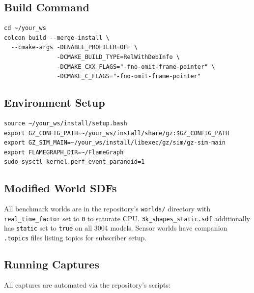 \documentclass[11pt, a4paper]{article}
\begin{document}
\subsection{Build Command}

\begin{verbatim}
cd ~/your_ws
colcon build --merge-install \
  --cmake-args -DENABLE_PROFILER=OFF \
               -DCMAKE_BUILD_TYPE=RelWithDebInfo \
               -DCMAKE_CXX_FLAGS="-fno-omit-frame-pointer" \
               -DCMAKE_C_FLAGS="-fno-omit-frame-pointer"
\end{verbatim}

\subsection{Environment Setup}

\begin{verbatim}
source ~/your_ws/install/setup.bash
export GZ_CONFIG_PATH=~/your_ws/install/share/gz:$GZ_CONFIG_PATH
export GZ_SIM_MAIN=~/your_ws/install/libexec/gz/sim/gz-sim-main
export FLAMEGRAPH_DIR=~/FlameGraph
sudo sysctl kernel.perf_event_paranoid=1
\end{verbatim}

\subsection{Modified World SDFs}

All benchmark worlds are in the repository's \texttt{worlds/} directory with
\texttt{real\_time\_factor} set to \texttt{0} to saturate CPU.
\texttt{3k\_shapes\_static.sdf} additionally has
\texttt{static} set to \texttt{true} on all 3004 models.
Sensor worlds have companion \texttt{.topics} files listing topics for subscriber setup.

\subsection{Running Captures}

All captures are automated via the repository's scripts:
\end{document}
